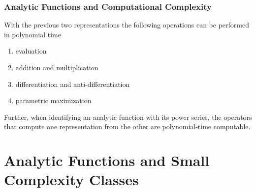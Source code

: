 \documentclass[xcolor=pdftex,dvipsnames,table]{beamer}
\begin{document}
\begin{frame}
\frametitle{Analytic Functions and Computational Complexity}
\begin{theorem}
  With the previous two representations the following operations can be performed in polynomial time
\begin{enumerate}
\item evaluation
\item addition and multiplication
\item differentiation and anti-differentiation
\item parametric maximization
\end{enumerate}
Further, when identifying an analytic function with its power series, the operators that compute one representation from the other are polynomial-time computable.
\end{theorem}
\end{frame}
\section{Analytic Functions and Small Complexity Classes}
\end{document}
